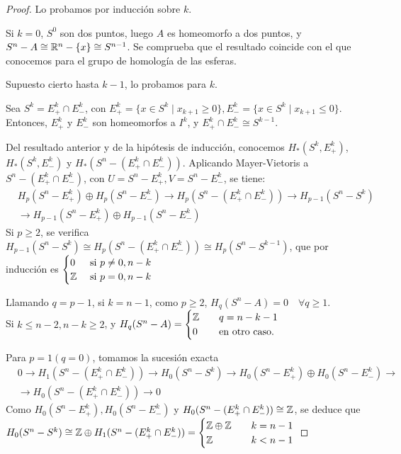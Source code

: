 \begin{proof}
  Lo probamos por inducción sobre $k$.

  Si $k = 0$, $S^0$ son dos puntos, luego $A$ es homeomorfo a dos puntos, y $S^n - A \cong \mathbb{R}^n - \{x\} \cong S^{n-1}$.
  Se comprueba que el resultado coincide con el que conocemos para el grupo de homología de las esferas.

  Supuesto cierto hasta $k - 1$, lo probamos para $k$.

  Sea $S^k = E_+^k \cap E_-^k$, con $E_+^k = \{x \in S^k \mid x_{k+1} \geq 0\}, E_-^k = \{x \in S^k \mid x_{k+1} \leq 0\}$.
  Entonces, $E_+^k$ y $E_-^k$ son homeomorfos a $I^k$, y $E_+^k \cap E_-^k \cong S^{k-1}$.

  Del resultado anterior y de la hipótesis de inducción, conocemos $H_*(S^k, E_+^k)$, $H_*(S^k, E_-^k)$ y $H_*(S^n - (E_+^k \cap E_-^k))$.
  Aplicando Mayer-Vietoris a $S^n - (E_+^k \cap E_-^k)$, con $U = S^n - E_+^k, V = S^n - E_-^k$, se tiene:
  \begin{align*}
    &H_p(S^n - E_+^k) \oplus H_p(S^n - E_-^k) \to H_p(S^n - (E_+^k \cap E_-^k)) \to H_{p-1}(S^n - S^k) \\
    &\to H_{p-1}(S^n - E_+^k) \oplus H_{p-1}(S^n - E_-^k)
  \end{align*}
  Si $p \geq 2$, se verifica $H_{p-1}(S^n - S^k) \cong H_p(S^n - (E_+^k \cap E_-^k)) \cong H_p(S^n - S^{k-1})$,
  que por inducción es $\begin{cases} 0 &\text{ si } p \neq 0, n-k \\ \mathbb{Z} &\text{ si } p = 0, n-k \end{cases}$

  Llamando $q = p-1$, si $k = n-1$, como $p \geq 2$, $H_q(S^n - A) = 0 \quad \forall q \geq 1$.\\
  Si $k \leq n-2, n-k \geq 2$, y $H_q(S^n - A) = \begin{cases} \mathbb{Z} &\quad q = n-k-1 \\ 0 &\quad \text{en otro caso.} \end{cases}$

  Para $p = 1 (q = 0)$, tomamos la sucesión exacta
  \begin{align*}
    &0 \to H_1(S^n - (E_+^k \cap E_-^k)) \to H_0(S^n - S^k) \to H_0(S^n - E_+^k) \oplus H_0(S^n - E_-^k) \to \\
    &\to H_0(S^n - (E_+^k \cap E_-^k)) \to 0
  \end{align*}
  Como $H_0(S^n - E_+^k), H_0(S^n - E_-^k)$ y $H_0(S^n - (E_+^k \cap E_-^k)) \cong \mathbb{Z}$,
  se deduce que $H_0(S^n - S^k) \cong \mathbb{Z} \oplus H_1(S^n - (E_+^k \cap E_-^k)) = \begin{cases} \mathbb{Z} \oplus \mathbb{Z} &\quad k = n-1 \\
                                                                                                    \mathbb{Z} &\quad k < n - 1  \end{cases} $
\end{proof}

